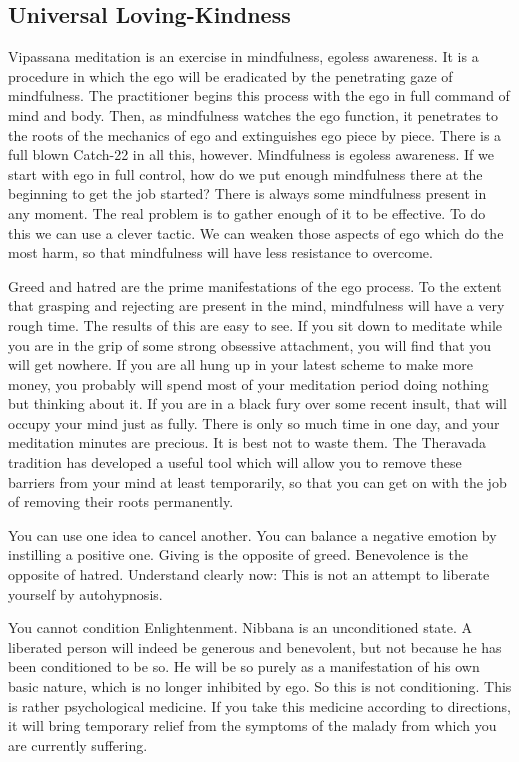 \subsection*{Universal Loving-Kindness}

Vipassana meditation
is an exercise in mindfulness, egoless awareness. It is a procedure in which the
ego will be eradicated by the penetrating gaze of mindfulness. The practitioner
begins this process with the ego in full command of mind and body. Then, as
mindfulness watches the ego function, it penetrates to the roots of the
mechanics of ego and extinguishes ego piece by piece. There is a full blown
Catch-22 in all this, however. Mindfulness is egoless awareness. If we start
with ego in full control, how do we put enough mindfulness there at the
beginning to get the job started? There is always some mindfulness present in
any moment. The real problem is to gather enough of it to be effective. To do
this we can use a clever tactic. We can weaken those aspects of ego which do the
most harm, so that mindfulness will have less resistance to overcome.

Greed and hatred are the prime manifestations of the ego process. To the extent
that grasping and rejecting are present in the mind, mindfulness will have a
very rough time. The results of this are easy to see. If you sit down to
meditate while you are in the grip of some strong obsessive attachment, you will
find that you will get nowhere. If you are all hung up in your latest scheme to
make more money, you probably will spend most of your meditation period doing
nothing but thinking about it. If you are in a black fury over some recent
insult, that will occupy your mind just as fully. There is only so much time in
one day, and your meditation minutes are precious. It is best not to waste them.
The Theravada tradition has developed a useful tool which will allow you to
remove these barriers from your mind at least temporarily, so that you can get
on with the job of removing their roots permanently.

You can use one idea to cancel another. You can balance a negative emotion by
instilling a positive one. Giving is the opposite of greed. Benevolence is the
opposite of hatred. Understand clearly now: This is not an attempt to liberate
yourself by autohypnosis.

You cannot condition Enlightenment. Nibbana is an unconditioned state. A
liberated person will indeed be generous and benevolent, but not because he has
been conditioned to be so. He will be so purely as a manifestation of his own
basic nature, which is no longer inhibited by ego. So this is not conditioning.
This is rather psychological medicine. If you take this medicine according to
directions, it will bring temporary relief from the symptoms of the malady from
which you are currently suffering.

